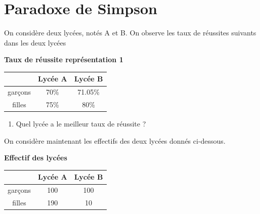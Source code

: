 \documentclass[10pt, a4paper]{article}
\begin{document}
\newpage




\section{Paradoxe de Simpson}





\begin{tcolorbox}[lefttitle=2cm, colframe=gray!75!black, colback=white, title=\textbf{EXERCICE 7 : Paradoxe de Simpson}]


On considère deux lycées, notés A et B. On observe les taux de réussites suivants dans les deux lycées

\begin{minipage}{0.4\textwidth}
\textbf{Taux de réussite représentation 1}
   \centering
    
    \begin{tabular}{|c|c|c|} \hline
        &Lycée A   & Lycée B \\\hline
         garçons& 70\%& 71.05\%\\\hline
         filles &75\%& 80\%\\\hline
    \end{tabular}

\end{minipage} \hfill
\begin{minipage}{0.6\textwidth}

\begin{tcolorbox}[lefttitle=1cm, colframe=gray!75!black, colback=white, title=\textbf{EXERCICE 7.1 : représentation 1}]
\begin{enumerate}
    \item Quel lycée a le meilleur taux de réussite ?
\end{enumerate}
\vspace{1cm}

\end{tcolorbox}

\end{minipage}

\vspace{0.5cm}

\begin{tcolorbox}[lefttitle=1cm, colframe=gray!75!black, colback=white, title=\textbf{EXERCICE 7.2 : représentation 2}]
On considère maintenant les effectifs des deux lycées donnés ci-dessous. 


\begin{minipage}{0.4\textwidth}
\textbf{Effectif des lycées}
   \centering
    \begin{tabular}{|c|c|c|} \hline
        &Lycée A   & Lycée B \\\hline
         garçons &100& 100\\\hline
         filles &190& 10\\\hline
    \end{tabular}


\end{minipage}
\end{tcolorbox}
\end{tcolorbox}
\end{document}
